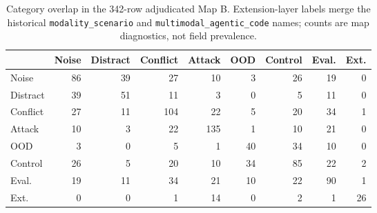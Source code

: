 \begin{table}[t]
\centering
\scriptsize
\begin{tabular}{lrrrrrrrr}
\toprule
 & Noise & Distract & Conflict & Attack & OOD & Control & Eval. & Ext. \\ 
\midrule
Noise & 86 & 39 & 27 & 10 & 3 & 26 & 19 & 0 \\ 
Distract & 39 & 51 & 11 & 3 & 0 & 5 & 11 & 0 \\ 
Conflict & 27 & 11 & 104 & 22 & 5 & 20 & 34 & 1 \\ 
Attack & 10 & 3 & 22 & 135 & 1 & 10 & 21 & 0 \\ 
OOD & 3 & 0 & 5 & 1 & 40 & 34 & 10 & 0 \\ 
Control & 26 & 5 & 20 & 10 & 34 & 85 & 22 & 2 \\ 
Eval. & 19 & 11 & 34 & 21 & 10 & 22 & 90 & 1 \\ 
Ext. & 0 & 0 & 1 & 14 & 0 & 2 & 1 & 26 \\ 
\bottomrule
\end{tabular}
\caption{Category overlap in the 342-row adjudicated Map B. Extension-layer labels merge the historical \texttt{modality\_scenario} and \texttt{multimodal\_agentic\_code} names; counts are map diagnostics, not field prevalence.}
\label{tab:category-overlap}
\end{table}
